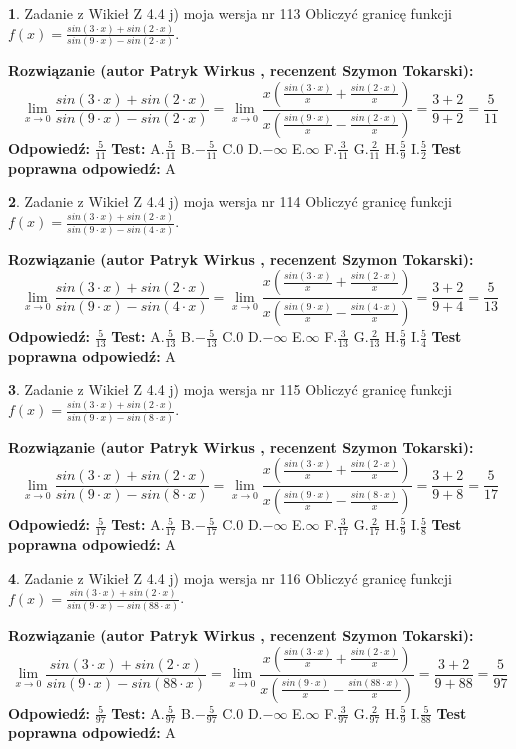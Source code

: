\documentclass[12pt, a4paper]{article}
\theoremstyle{definition} %
\newtheorem{zad}{}
\newcommand{\zadStart}[1]{\begin{zad}#1\newline}
\newcommand{\zadStop}{\end{zad}}
\newcommand{\rozwStart}[2]{\noindent \textbf{Rozwiązanie (autor #1 , recenzent #2): }\newline}
\newcommand{\rozwStop}{\newline}
\newcommand{\odpStart}{\noindent \textbf{Odpowiedź:}\newline}
\newcommand{\odpStop}{\newline}
\newcommand{\testStart}{\noindent \textbf{Test:}\newline}
\newcommand{\testStop}{\newline}
\newcommand{\kluczStart}{\noindent \textbf{Test poprawna odpowiedź:}\newline}
\newcommand{\kluczStop}{\newline}
\begin{document}
\zadStart{Zadanie z Wikieł Z 4.4 j) moja wersja nr 113}
Obliczyć granicę funkcji $f(x)=\frac{sin(3\cdot x) +sin(2\cdot x)}{sin(9\cdot x) -sin(2\cdot x)}$.
\zadStop
\rozwStart{Patryk Wirkus}{Szymon Tokarski}
$$\lim\limits_{x\to 0}\frac{sin(3\cdot x) +sin(2\cdot x)}{sin(9\cdot x) -sin(2\cdot x)}=\lim\limits_{x\to 0}\frac{x(\frac{sin(3\cdot x)}{x}+\frac{sin(2\cdot x)}{x})}{x(\frac{sin(9\cdot x)}{x}-\frac{sin(2\cdot x)}{x})}=\frac{3+2}{9+2} = \frac{5}{11}$$
\rozwStop
\odpStart
$\frac{5}{11}$
\odpStop
\testStart
A.$\frac{5}{11}$
B.$-\frac{5}{11}$
C.$0$
D.$-\infty$
E.$\infty$
F.$\frac{3}{11}$
G.$\frac{2}{11}$
H.$\frac{5}{9}$
I.$\frac{5}{2}$
\testStop
\kluczStart
A
\kluczStop



\zadStart{Zadanie z Wikieł Z 4.4 j) moja wersja nr 114}
Obliczyć granicę funkcji $f(x)=\frac{sin(3\cdot x) +sin(2\cdot x)}{sin(9\cdot x) -sin(4\cdot x)}$.
\zadStop
\rozwStart{Patryk Wirkus}{Szymon Tokarski}
$$\lim\limits_{x\to 0}\frac{sin(3\cdot x) +sin(2\cdot x)}{sin(9\cdot x) -sin(4\cdot x)}=\lim\limits_{x\to 0}\frac{x(\frac{sin(3\cdot x)}{x}+\frac{sin(2\cdot x)}{x})}{x(\frac{sin(9\cdot x)}{x}-\frac{sin(4\cdot x)}{x})}=\frac{3+2}{9+4} = \frac{5}{13}$$
\rozwStop
\odpStart
$\frac{5}{13}$
\odpStop
\testStart
A.$\frac{5}{13}$
B.$-\frac{5}{13}$
C.$0$
D.$-\infty$
E.$\infty$
F.$\frac{3}{13}$
G.$\frac{2}{13}$
H.$\frac{5}{9}$
I.$\frac{5}{4}$
\testStop
\kluczStart
A
\kluczStop



\zadStart{Zadanie z Wikieł Z 4.4 j) moja wersja nr 115}
Obliczyć granicę funkcji $f(x)=\frac{sin(3\cdot x) +sin(2\cdot x)}{sin(9\cdot x) -sin(8\cdot x)}$.
\zadStop
\rozwStart{Patryk Wirkus}{Szymon Tokarski}
$$\lim\limits_{x\to 0}\frac{sin(3\cdot x) +sin(2\cdot x)}{sin(9\cdot x) -sin(8\cdot x)}=\lim\limits_{x\to 0}\frac{x(\frac{sin(3\cdot x)}{x}+\frac{sin(2\cdot x)}{x})}{x(\frac{sin(9\cdot x)}{x}-\frac{sin(8\cdot x)}{x})}=\frac{3+2}{9+8} = \frac{5}{17}$$
\rozwStop
\odpStart
$\frac{5}{17}$
\odpStop
\testStart
A.$\frac{5}{17}$
B.$-\frac{5}{17}$
C.$0$
D.$-\infty$
E.$\infty$
F.$\frac{3}{17}$
G.$\frac{2}{17}$
H.$\frac{5}{9}$
I.$\frac{5}{8}$
\testStop
\kluczStart
A
\kluczStop



\zadStart{Zadanie z Wikieł Z 4.4 j) moja wersja nr 116}
Obliczyć granicę funkcji $f(x)=\frac{sin(3\cdot x) +sin(2\cdot x)}{sin(9\cdot x) -sin(88\cdot x)}$.
\zadStop
\rozwStart{Patryk Wirkus}{Szymon Tokarski}
$$\lim\limits_{x\to 0}\frac{sin(3\cdot x) +sin(2\cdot x)}{sin(9\cdot x) -sin(88\cdot x)}=\lim\limits_{x\to 0}\frac{x(\frac{sin(3\cdot x)}{x}+\frac{sin(2\cdot x)}{x})}{x(\frac{sin(9\cdot x)}{x}-\frac{sin(88\cdot x)}{x})}=\frac{3+2}{9+88} = \frac{5}{97}$$
\rozwStop
\odpStart
$\frac{5}{97}$
\odpStop
\testStart
A.$\frac{5}{97}$
B.$-\frac{5}{97}$
C.$0$
D.$-\infty$
E.$\infty$
F.$\frac{3}{97}$
G.$\frac{2}{97}$
H.$\frac{5}{9}$
I.$\frac{5}{88}$
\testStop
\kluczStart
A
\kluczStop
\end{document}
